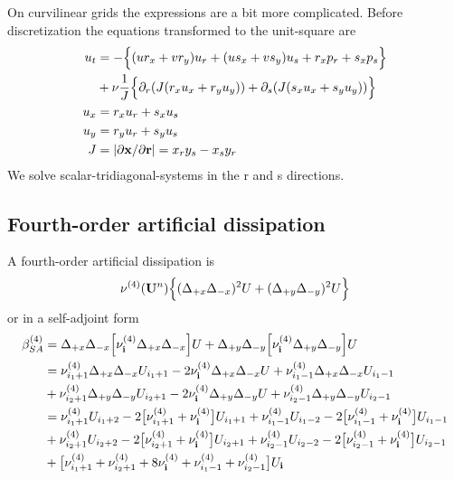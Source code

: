 On curvilinear grids the expressions are a bit more complicated.
Before discretization the equations transformed to the unit-square are
\begin{align*}
 u_t &= -\Big\{ ( u r_x + v r_y ) u_r + ( u s_x + v s_y ) u_s + r_x p_r + s_x p_s \Big\}  \\
     &   + \nu {1\over J}\Big\{ \partial_r(J(r_x u_x + r_y u_y) ) + \partial_s(J(s_x u_x + s_y u_y) ) \Big\} \\
     u_x & = r_x u_r + s_x u_s \\
     u_y & = r_y u_r + s_y u_s \\
     J &= \vert \partial \mathbf{ x}/\partial \mathbf{ r} \vert = x_r y_s - x_s y_r
\end{align*}
We solve scalar-tridiagonal-systems in the r and s directions.

\subsection{Fourth-order artificial dissipation}

\newcommand{\nuAf}{\nu^{(4)}}
A fourth-order artificial dissipation is 
\begin{align*}
 \nuAf(\Uv^n) \Big\{ (\Delta_{+x}\Delta_{-x})^2 U + (\Delta_{+y}\Delta_{-y})^2 U  \Big\} \\
\end{align*}
or in a self-adjoint form
\begin{align*}
 \beta_{SA}^{(4)}
            &=   \Delta_{+x}\Delta_{-x}\Big[\nuAf_{\iv} \Delta_{+x}\Delta_{-x}\Big] U 
               + \Delta_{+y}\Delta_{-y}\Big[\nuAf_{\iv} \Delta_{+y}\Delta_{-y}\Big] U \\
            &=  \nuAf_{i_1+1}\Delta_{+x}\Delta_{-x} U_{i_1+1} 
              -2\nuAf_{\iv}  \Delta_{+x}\Delta_{-x} U
               +\nuAf_{i_1-1}\Delta_{+x}\Delta_{-x} U_{i_1-1}  \\
            &+  \nuAf_{i_2+1}\Delta_{+y}\Delta_{-y} U_{i_2+1} 
              -2\nuAf_{\iv}  \Delta_{+y}\Delta_{-y} U
               +\nuAf_{i_2-1}\Delta_{+y}\Delta_{-y} U_{i_2-1} \\
            &= \nuAf_{i_1+1}U_{i_1+2} -2 \big[\nuAf_{i_1+1}+\nuAf_\iv\big] U_{i_1+1}      
             + \nuAf_{i_1-1}U_{i_1-2} -2 \big[\nuAf_{i_1-1}+\nuAf_\iv\big] U_{i_1-1}    \\
            &+ \nuAf_{i_2+1}U_{i_2+2} -2 \big[\nuAf_{i_2+1}+\nuAf_\iv\big] U_{i_2+1}      
             + \nuAf_{i_2-1}U_{i_2-2} -2 \big[\nuAf_{i_2-1}+\nuAf_\iv\big] U_{i_2-1}  \\  
            & +\big[\nuAf_{i_1+1}+\nuAf_{i_2+1}+8\nuAf_\iv+\nuAf_{i_1-1}+\nuAf_{i_2-1}\big] U_\iv  \\
\end{align*}





